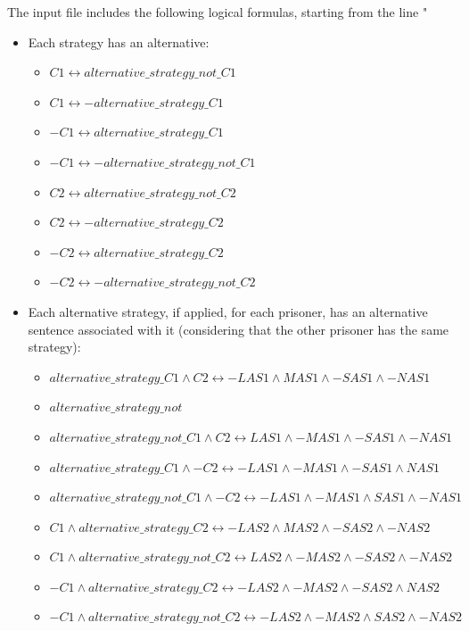 \documentclass[a4paper,12pt]{report}
\begin{document}
The input file includes the following logical formulas, starting from the line "%

\begin{itemize}
\item Each strategy has an alternative:
\begin{itemize}
\item $C1 \leftrightarrow alternative\_strategy\_not\_C1$
\item $C1 \leftrightarrow -alternative\_strategy\_C1$
\item $-C1 \leftrightarrow alternative\_strategy\_C1$
\item $-C1 \leftrightarrow -alternative\_strategy\_not\_C1$
\item $C2 \leftrightarrow alternative\_strategy\_not\_C2$
\item $C2 \leftrightarrow -alternative\_strategy\_C2$
\item $-C2 \leftrightarrow alternative\_strategy\_C2$
\item $-C2 \leftrightarrow -alternative\_strategy\_not\_C2$
\end{itemize}
\item Each alternative strategy, if applied, for each prisoner, has an alternative sentence associated with it (considering that the other prisoner has the same strategy):
\begin{itemize}
\item $alternative\_strategy\_C1 \land C2 \leftrightarrow -LAS1 \land MAS1 \land -SAS1 \land -NAS1$
\item $alternative\_strategy\_not$
\item $alternative\_strategy\_not\_C1 \land C2 \leftrightarrow LAS1 \land -MAS1 \land -SAS1 \land -NAS1$
\item $alternative\_strategy\_C1 \land -C2 \leftrightarrow -LAS1 \land -MAS1 \land -SAS1 \land NAS1$
\item $alternative\_strategy\_not\_C1 \land -C2 \leftrightarrow -LAS1 \land -MAS1 \land SAS1 \land -NAS1$
\item $C1 \land alternative\_strategy\_C2 \leftrightarrow -LAS2 \land MAS2 \land -SAS2 \land -NAS2$
\item $C1 \land alternative\_strategy\_not\_C2 \leftrightarrow LAS2 \land -MAS2 \land -SAS2 \land -NAS2$
\item $-C1 \land alternative\_strategy\_C2 \leftrightarrow -LAS2 \land -MAS2 \land -SAS2 \land NAS2$
\item $-C1 \land alternative\_strategy\_not\_C2 \leftrightarrow -LAS2 \land -MAS2 \land SAS2 \land -NAS2$
\end{itemize}
\end{itemize}
\end{document}
